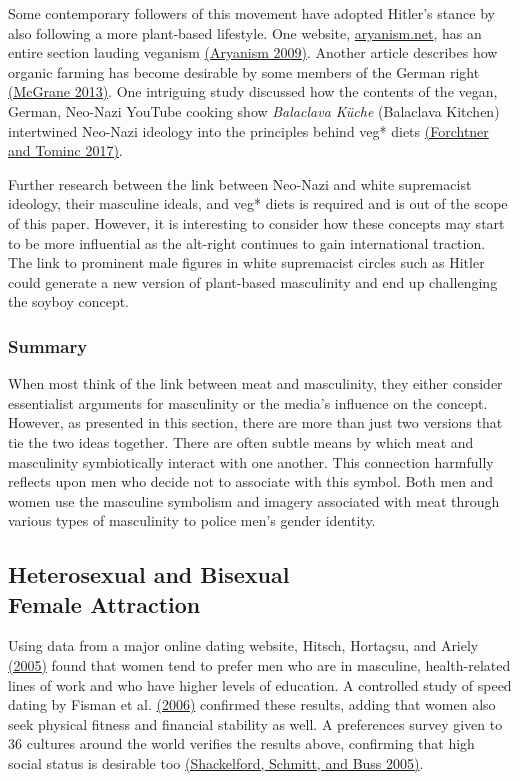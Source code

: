 \documentclass[twoside]{report}
\begin{document}
\begin{multicols}{2}
Some contemporary followers of this movement have adopted Hitler's
stance by also following a more plant-based lifestyle. One website,
\href{https://www.aryanism.net}{aryanism.net}, has an entire section lauding veganism \hyperlink{aryanism}{(Aryanism 2009)}. Another article describes how organic farming has become desirable by some members of the German right \hyperlink{mcgrane}{(McGrane 2013)}. One intriguing study discussed how the contents of the vegan, German, Neo-Nazi YouTube cooking show \textit{Balaclava Küche} (Balaclava Kitchen) intertwined Neo-Nazi ideology into the principles behind veg* diets \hyperlink{forchtner}{(Forchtner and Tominc 2017)}.

Further research between the link between Neo-Nazi and white supremacist
ideology, their masculine ideals, and veg* diets is required and is out
of the scope of this paper. However, it is interesting to consider how
these concepts may start to be more influential as the alt-right
continues to gain international traction. The link to prominent male
figures in white supremacist circles such as Hitler could generate a new
version of plant-based masculinity and end up challenging the
soyboy concept.

\subsubsection{Summary}

When most think of the link between meat and masculinity, they either
consider essentialist arguments for masculinity or the media's influence
on the concept. However, as presented in this section, there are more
than just two versions that tie the two ideas together. There are often subtle means by which meat and masculinity symbiotically interact with one another. This connection harmfully reflects upon men who decide not to associate with this symbol. Both men and women use the masculine symbolism and imagery associated with meat through various types of masculinity to police men's gender identity.

\subsection[Heterosexual and Bisexual Female Attraction]{Heterosexual and Bisexual\\ Female Attraction}

Using data from a major online dating website, Hitsch, Hortaçsu, and
Ariely \hyperlink{hitsch1}{(2005)} found that women tend to prefer men who are in masculine, health-related lines of work and who have higher levels of education. A controlled study of speed dating by Fisman
et al. \hyperlink{fisman}{(2006)} confirmed these results, adding that women also seek physical fitness and financial stability as well. A preferences survey given to 36 cultures around the world verifies the results above, confirming that high social status is desirable too \hyperlink{shackelford}{(Shackelford, Schmitt, and Buss 2005)}.


\end{multicols}
\end{document}
